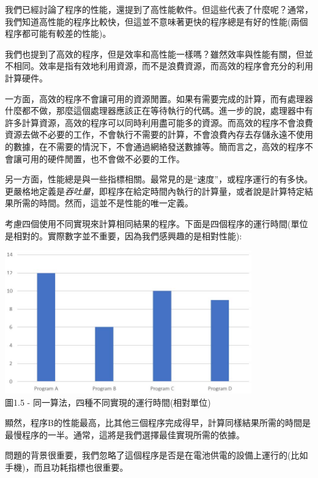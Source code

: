 我們已經討論了程序的性能，還提到了高性能軟件。但這些代表了什麼呢？通常，我們知道高性能的程序比較快，但這並不意味著更快的程序總是有好的性能(兩個程序都可能有較差的性能)。

我們也提到了高效的程序，但是效率和高性能一樣嗎？雖然效率與性能有關，但並不相同。效率是指有效地利用資源，而不是浪費資源，而高效的程序會充分的利用計算硬件。

一方面，高效的程序不會讓可用的資源閒置。如果有需要完成的計算，而有處理器什麼都不做，那麼這個處理器應該正在等待執行的代碼。進一步的說，處理器中有許多計算資源，高效的程序可以同時利用盡可能多的資源。而高效的程序不會浪費資源去做不必要的工作，不會執行不需要的計算，不會浪費內存去存儲永遠不使用的數據，在不需要的情況下，不會通過網絡發送數據等。簡而言之，高效的程序不會讓可用的硬件閒置，也不會做不必要的工作。

另一方面，性能總是與一些指標相關。最常見的是“速度”，或程序運行的有多快。更嚴格地定義是\textit{吞吐量}，即程序在給定時間內執行的計算量，或者說是計算特定結果所需的時間。然而，這並不是性能的唯一定義。


考慮四個使用不同實現來計算相同結果的程序。下面是四個程序的運行時間(單位是相對的。實際數字並不重要，因為我們感興趣的是相對性能):

\begin{center}
\includegraphics[width=0.8\textwidth]{content/1/chapter1/images/5.jpg}\\
圖1.5 - 同一算法，四種不同實現的運行時間(相對單位)
\end{center}

顯然，程序B的性能最高，比其他三個程序完成得早，計算同樣結果所需的時間是最慢程序的一半。通常，這將是我們選擇最佳實現所需的依據。

問題的背景很重要，我們忽略了這個程序是否是在電池供電的設備上運行的(比如手機)，而且功耗指標也很重要。

